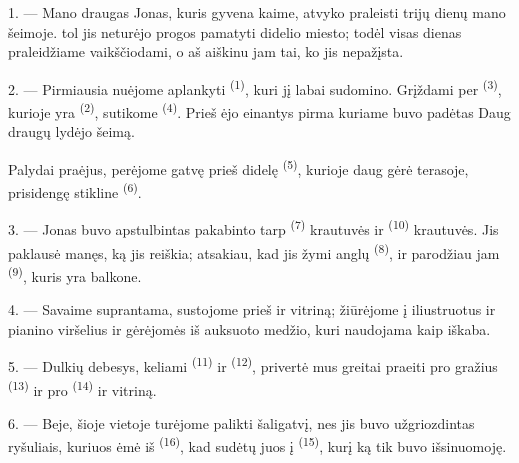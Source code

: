 \VUsaut{4.0mm}
\VUsaut{3.0mm}

\VUsaut{3.0mm}

1. --- Mano draugas Jonas, kuris gyvena kaime, atvyko praleisti trijų dienų mano
šeimoje.  tol jis neturėjo progos pamatyti didelio miesto; todėl visas
dienas praleidžiame vaikščiodami, o aš aiškinu jam tai, ko jis nepažįsta.

2. --- Pirmiausia nuėjome aplankyti  \textsuperscript{(1)},
kuri jį labai sudomino. Grįždami per  \textsuperscript{(3)}, kurioje yra
 \textsuperscript{(2)}, sutikome 
\textsuperscript{(4)}. Prieš  ėjo 
einantys pirma  kuriame buvo padėtas  Daug draugų
lydėjo  šeimą.

Palydai praėjus, perėjome gatvę prieš didelę  \textsuperscript{(5)},
kurioje daug  gėrė  terasoje, prisidengę stikline
 \textsuperscript{(6)}.

3. --- Jonas buvo apstulbintas  pakabinto tarp  \textsuperscript{(7)} krautuvės ir 
\textsuperscript{(10)} krautuvės. Jis paklausė manęs, ką jis reiškia; atsakiau, kad jis
žymi anglų  \textsuperscript{(8)}, ir parodžiau jam 
\textsuperscript{(9)}, kuris yra balkone.

\VUsaut{3.0mm}

4. --- Savaime suprantama, sustojome prieš 
  ir  vitriną; žiūrėjome į
iliustruotus  ir pianino  viršelius ir gėrėjomės
 iš auksuoto medžio, kuri naudojama kaip iškaba.

5. --- Dulkių debesys, keliami  \textsuperscript{(11)} ir
 \textsuperscript{(12)}, privertė mus greitai praeiti pro gražius
 \textsuperscript{(13)}  ir pro
 \textsuperscript{(14)}  ir 
vitriną.

6. --- Beje, šioje vietoje turėjome palikti šaligatvį, nes jis buvo užgriozdintas
ryšuliais, kuriuos ėmė iš  \textsuperscript{(16)}, kad sudėtų
juos į  \textsuperscript{(15)}, kurį ką tik buvo išsinuomoję.


